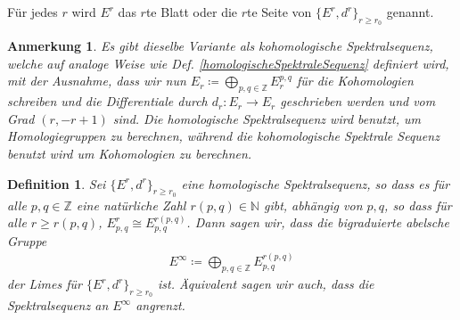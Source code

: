 \documentclass[12pt, hidelinks]{article}
\numberwithin{conj}{section}
\newtheorem{definition}[conj]{Definition}
\newtheorem{remark}[conj]{Anmerkung}
\newcommand{\Z}{\mathbb{Z}}
\begin{document}
Für jedes $r$ wird $E^r$ das $r$te Blatt oder die $r$te Seite von $\{E^r,d^r\}_{r \geq r_0}$ genannt.

\begin{remark}
    Es gibt dieselbe Variante als kohomologische Spektralsequenz, welche auf analoge Weise wie Def. \ref{homologischeSpektraleSequenz} definiert wird, mit der Ausnahme, dass wir nun $E_r \coloneq \bigoplus_{p,q \in \Z} E^{p,q}_r$ für die Kohomologien schreiben und die Differentiale durch $d_r: E_r \to E_r$ geschrieben werden und vom Grad $(r,-r+1)$ sind. Die homologische Spektralsequenz wird benutzt, um Homologiegruppen zu berechnen, während die kohomologische Spektrale Sequenz benutzt wird um Kohomologien zu berechnen.
\end{remark}

\begin{definition}
    Sei $\{E^r, d^r\}_{r \geq r_0}$ eine homologische Spektralsequenz, so dass es für alle $p,q \in \Z$ eine natürliche Zahl $r(p,q) \in \mathbb{N}$ gibt, abhängig von $p,q$, so dass für alle $r \geq r(p,q)$, $E^r_{p,q} \cong E_{p,q}^{r(p,q)}$. Dann sagen wir, dass die bigraduierte abelsche Gruppe
    \begin{align}
        E^\infty \coloneq \bigoplus_{p,q \in \Z} E^{r(p,q)}_{p,q}
    \end{align}
    der Limes für $\{E^r, d^r\}_{r \geq r_0}$ ist. Äquivalent sagen wir auch, dass die Spektralsequenz an $E^\infty$ angrenzt.
\end{definition}
\end{document}
